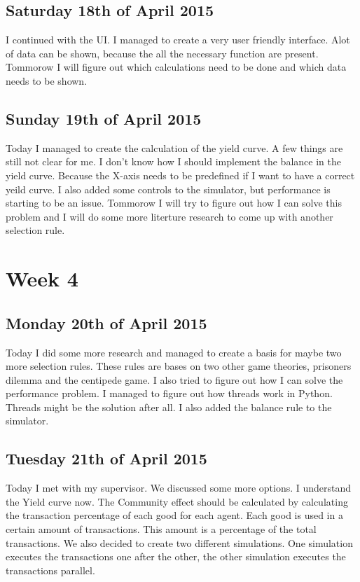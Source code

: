 \documentclass{article}
\begin{document}
\subsection{Saturday 18th of April 2015}
I continued with the UI. I managed to create a very user friendly interface. Alot of data can be shown, because the all the necessary function are present. Tommorow I will figure out which calculations need to be done and which data needs to be shown.

\subsection{Sunday 19th of April 2015}
Today I managed to create the calculation of the yield curve. A few things are still not clear for me. I don't know how I should implement the balance in the yield curve. Because the X-axis needs to be predefined if I want to have a correct yeild curve. I also added some controls to the simulator, but performance is starting to be an issue. Tommorow I will try to figure out how I can solve this problem and I will do some more literture research to come up with another selection rule.


\section{Week 4}

\subsection{Monday 20th of April 2015}
Today I did some more research and managed to create a basis for maybe two more selection rules. These rules are bases on two other game theories, prisoners dilemma and the centipede game. I also tried to figure out how I can solve the performance problem. I managed to figure out how threads work in Python. Threads might be the solution after all.
I also added the balance rule to the simulator.

\subsection{Tuesday 21th of April 2015}
Today I met with my supervisor. We discussed some more options. I understand the Yield curve now. The Community effect should be calculated by calculating the transaction percentage of each good for each agent. Each good is used in a certain amount of transactions. This amount is a percentage of the total transactions. 
We also decided to create two different simulations. One simulation executes the transactions one after the other, the other simulation executes the transactions parallel.
\end{document}
